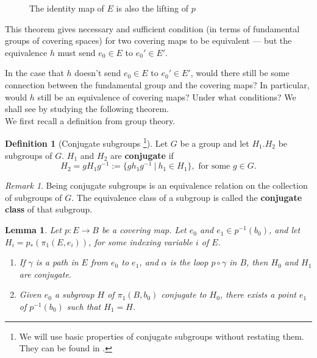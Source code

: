 \documentclass{amsart}
\newtheorem{lemma}[theorem]{Lemma}
\theoremstyle{definition}
\newtheorem{definition}[theorem]{Definition}
\theoremstyle{remark}
\newtheorem{remark}[theorem]{Remark}
\numberwithin{equation}{section}
\begin{document}
\begin{figure}
    \centering
    \caption{The identity map of $E$ is also the lifting of $p$}
\end{figure}

\noindent This theorem gives necessary and sufficient condition (in terms of fundamental groups of covering spaces) for two covering maps to be equivalent --- but the equivalence $h$ must send $e_0 \in E$ to $e_0' \in E'$.

In the case that $h$ doesn't send $e_0 \in E$ to $e_0' \in E'$, would there still be some connection between the fundamental group and the covering maps? In particular, would $h$ still be an equivalence of covering maps? Under what conditions? We shall see by studying the following theorem.$$$$
\noindent We first recall a definition from group theory.
\begin{definition}[Conjugate subgroups \footnote{We will use basic properties of conjugate subgroups without restating them. They can be found in \cite{gal}.}]
    Let $G$ be a group and let $H_1. H_2$ be subgroups of $G$. $H_1$ and $H_2$ are \textbf{conjugate} if
    $$H_2 = gH_1g^{-1} := \{gh_1g^{-1}\ | \ h_1 \in H_1\}, \text{ for some $g \in G$.}$$
\end{definition}
\begin{remark}
    Being conjugate subgroups is an equivalence relation on the collection of subgroups of $G$. The equivalence class of a subgroup is called the \textbf{conjugate class} of that subgroup.
\end{remark}

\begin{lemma} Let $p : E \to B$ be a covering map. Let $e_0$ and $e_1 \in p^{-1}(b_0)$, and let $H_i = p_\ast(\pi_1(E, e_i))$, for some indexing variable $i$ of $E$.
\begin{enumerate}
    \item[(a)] If $\gamma$ is a path in $E$ from $e_0$ to $e_1$, and $\alpha$ is the loop $p \circ \gamma$ in $B$, then $H_0$ and $H_1$ are conjugate.
    \item[(b)] Given $e_0$ a subgroup $H$ of $\pi_1(B, b_0)$ conjugate to $H_0$, there exists a point $e_1$ of $p^{-1}(b_0)$ such that $H_1 = H$.
\end{enumerate}
\end{lemma}
\end{document}
